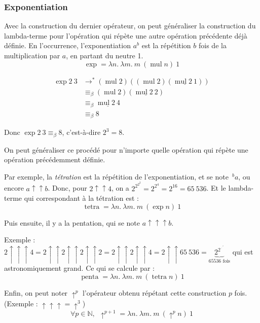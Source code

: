 \documentclass[11pt]{article}
\begin{document}
\subsubsection{Exponentiation}

Avec la construction du dernier opérateur, on peut généraliser la construction du lambda-terme pour l'opération qui répète une autre opération précédente déjà définie. En l'occurrence, l'exponentiation $a^b$ est la répétition $b$ fois de la multiplication par $a$, en partant du neutre 1.
$$\operatorname{exp}=\lambda n.~\lambda m.~m~(\operatorname{mul}n)~1$$

\begin{example}
    \begin{equation*}
    \begin{aligned}
        \operatorname{exp}2~3&\longrightarrow^* (\operatorname{mul} 2)((\operatorname{mul} 2) (\underline{\operatorname{mul} 2~1}))\\
        &\equiv_\beta (\operatorname{mul} 2)(\underline{\operatorname{mul} 2~2})\\
        &\equiv_\beta \underline{\operatorname{mul} 2~4}\\
        &\equiv_\beta 8
    \end{aligned}
    \end{equation*}

    Donc $\operatorname{exp}2~3\equiv_\beta 8$, c'est-à-dire $2^3=8$.
\end{example}

\begin{remark}
    On peut généraliser ce procédé pour n'importe quelle opération qui répète une opération précédemment définie. 
    
    Par exemple, la \textit{tétration} est la répétition de l'exponentiation, et se note $\,^b a$, ou encore $a \uparrow\uparrow b$. Donc, pour $2\uparrow\uparrow4$, on a $2^{2^{2^{2}}}=2^{2^4}=2^{16}=65~536$. Et le lambda-terme qui correspondant à la tétration est :
    $$\operatorname{tetra}=\lambda n.~\lambda m.~m~(\operatorname{exp} n)~1$$ 

    Puis ensuite, il y a la pentation, qui se note $a\uparrow\uparrow\uparrow b$. 
    
    Exemple : $2\uparrow\uparrow\uparrow4=2\uparrow\uparrow2\uparrow\uparrow2\uparrow\uparrow2=2\uparrow\uparrow2\uparrow\uparrow4=2\uparrow\uparrow 65~536=\underbrace{2^{2^{.^{.^{.^2}}}}}_\text{65536 fois}$ qui est astronomiquement grand. Ce qui se calcule par :
    $$\operatorname{penta}=\lambda n.~\lambda m.~m~(\operatorname{tetra} n)~1$$

    Enfin, on peut noter $\uparrow^p$ l'opérateur obtenu répétant cette construction $p$ fois. (Exemple : $\uparrow\uparrow\uparrow=\uparrow^3$)
    $$\forall p\in\mathbb{N},~~\uparrow^{p+1} = \lambda n.~\lambda m.~m~\left(\uparrow^p n\right)~1$$
\end{remark}
\end{document}
